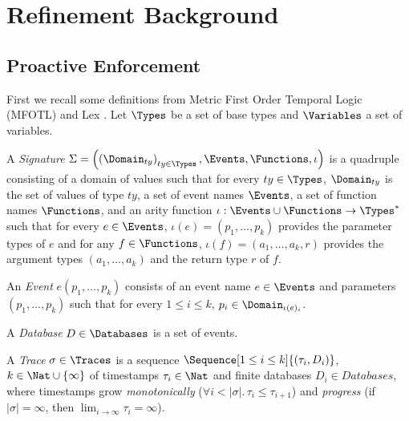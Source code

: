 \chapter{Refinement Background}

\section{Proactive Enforcement}

First we recall some definitions from Metric First Order Temporal Logic (MFOTL) and Lex \cite{whyenf, lex}.
Let $\Types$ be a set of base types and $\Variables$ a set of variables.

\begin{definition}\label{def:signature}
    A \emph{Signature}
    $\Sigma = \left( \left(\Domain_{ty}\right)_{ty \in \Types}, \Events, \Functions, \iota \right)$
    is a quadruple consisting of a domain of values such that
    for every $ty \in \Types$, $\Domain_{ty}$ is the set of values of type $ty$,
    a set of event names $\Events$, a set of function names $\Functions$,
    and an arity function $\iota : \Events \cup \Functions \to \Types^*$
    such that for every $e \in \Events$, $\iota(e) = (p_1,\dots,p_k)$ provides the
    parameter types of $e$
    and for any $f \in \Functions$, $\iota(f) = (a_1,\dots,a_k,r)$ provides the
    argument types $(a_1,\dots,a_k)$ and the return type $r$ of $f$.
\end{definition}

\begin{definition}\label{def:event}
    An \emph{Event} $e(p_1,\dots,p_k)$ consists of an event name
    $e \in \Events$ and parameters $(p_1,\dots,p_k)$ such that
    for every $1 \leq i \leq k$, $p_i \in \Domain_{\iota(e)_i}$.
\end{definition}

\begin{definition}\label{def:database}
    A \emph{Database} $D \in \Databases$ is a set of events.
\end{definition}

\begin{definition}\label{def:trace}
    A \emph{Trace} $\sigma \in \Traces$ is a sequence
    $\Sequence[1 \leq i \leq k]{(\tau_i, D_i)}$, $k \in \Nat \cup \lbrace \infty \rbrace$
    of timestamps $\tau_i \in \Nat$ and finite databases $D_i \in Databases$,
    where timestamps grow \emph{monotonically}
    ($\forall i < |\sigma|.\,\tau_i \leq \tau_{i+1}$)
    and \emph{progress}
    (if $|\sigma| = \infty$, then $\lim_{i\to\infty} \tau_i = \infty$).
\end{definition}

